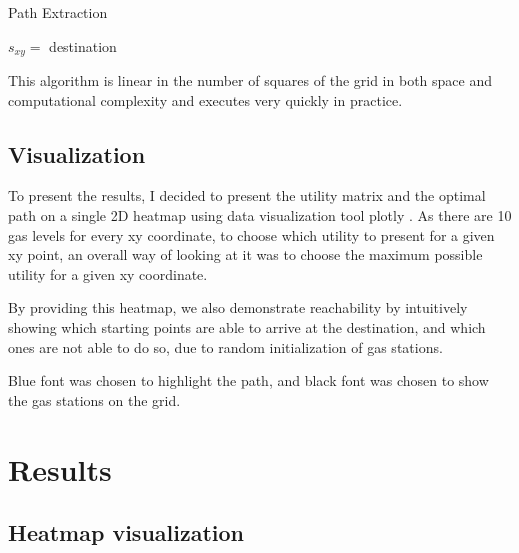 \documentclass[10pt,twocolumn,letterpaper]{article}
\begin{document}
\begin{algorithm}
\caption{Path Extraction}\label{euclid2}
\begin{algorithmic}[1]
\Repeat 
{}
\Until $s_{xy} =$ destination
\State {}
\EndFunction
\end{algorithmic}
\end{algorithm}

This algorithm is linear in the number of squares of the grid in both space and computational complexity and executes very quickly in practice.

\subsection{Visualization}

To present the results, I decided to present the utility matrix and the optimal path on a single 2D heatmap using data visualization tool plotly \cite{plotly1}. As there are 10 gas levels for every xy coordinate, to choose which utility to present for a given xy point, an overall way of looking at it was to choose the maximum possible utility for a given xy coordinate. 

By providing this heatmap, we also demonstrate reachability by intuitively showing which starting points are able to arrive at the destination, and which ones are not able to do so, due to random initialization of gas stations. 

Blue font was chosen to highlight the path, and black font was chosen to show the gas stations on the grid.

\section{Results}
\subsection{Heatmap visualization}
\end{document}
